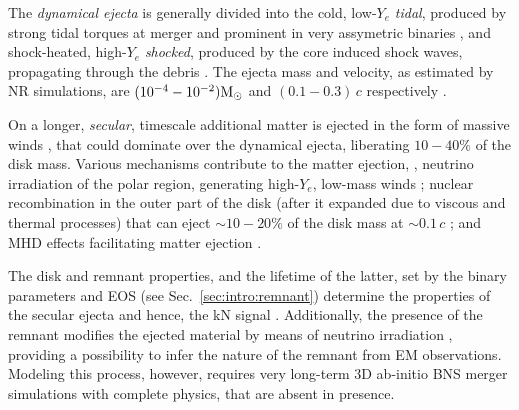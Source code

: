 The \textit{dynamical ejecta} is generally divided into 
the cold, low-$Y_e$ \textit{tidal}, produced by strong tidal torques at merger 
and prominent in very assymetric binaries
\citep{Rosswog:1998hy,Radice:2016dwd,Dietrich:2016hky},
and shock-heated, high-$Y_e$ \textit{shocked}, produced 
by the core \bnc{} induced shock waves, propagating through the \pmerg{} debris 
\citep{Hotokezaka:2013b, Bauswein:2013yna, Sekiguchi:2016bjd, Dietrich:2016hky, Radice:2018pdn}. 
%
The ejecta mass and velocity, as estimated by \ac{NR} simulations, are 
$(10^{-4}-10^{-2}){\text{M}_{\odot}}$ and $(0.1-0.3)\,c$ respectively 
\citep{Hotokezaka:2013b,Bauswein:2013yna,Sekiguchi:2016bjd,Radice:2018pdn}.

On a longer, \textit{secular}, timescale additional matter is ejected in the form of 
massive winds \citep{Lee:2009,Perego:2014fma,Fernandez:2015use,Siegel:2017nub,
    Fujibayashi:2017puw,Fernandez:2018kax,Miller:2019dpt}, %
that could dominate over the dynamical ejecta, liberating $10-40\%$ of the disk mass. 
Various mechanisms contribute to 
the matter ejection, \eg, neutrino irradiation of the polar region, generating high-$Y_e$, 
low-mass winds \citep{Perego:2014fma,Miller:2019dpt}; nuclear recombination in the outer 
part of the disk (after it expanded due to viscous and thermal processes) that can eject 
${\sim}10-20\%$ of the disk mass at ${\sim}0.1\,c$ \citep{Lee:2009,Fernandez:2015use,Fahlman:2018llv};
and \ac{MHD} effects facilitating matter ejection \citep{Fujibayashi:2017puw,Radice:2018xqa}.

The \pmerg{} disk and remnant properties, and the lifetime of the latter, set by the 
binary parameters and \ac{EOS} (see Sec.~\ref{sec:intro:remnant}) \citep{Radice:2018xqa,Perego:2019adq} 
determine the properties of the secular ejecta and hence, the \ac{kN} signal 
\citep[\eg][]{Radice:2018pdn}.
Additionally, the presence of the remnant modifies the ejected material by means of 
neutrino irradiation \citep{Fernandez:2015use}, providing a possibility to infer the nature of 
the remnant from \ac{EM} observations. Modeling this process, however, requires very long-term 
$3$D ab-initio \ac{BNS} merger simulations with complete physics, that are absent in presence.

